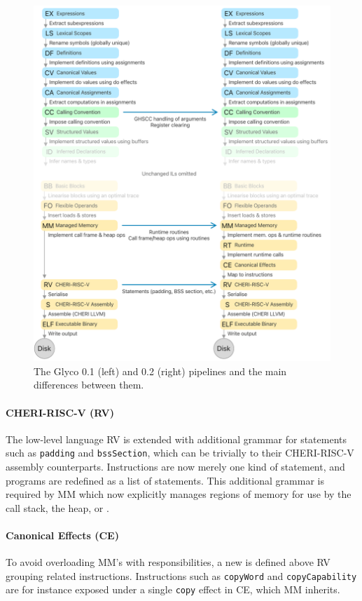 \documentclass[main.tex]{subfiles}
\begin{document}
\begin{figure}
	\centering
	\includegraphics{Images/Pipeline v0.2.pdf}
	\caption{The Glyco 0.1 (left) and 0.2 (right) pipelines and the main differences between them.}
	\label{fig:pipeline02}
\end{figure}

\paragraph{CHERI-RISC-V (RV)} The low-level language RV is extended with additional grammar for statements such as \texttt{padding} and \texttt{bssSection}, which can be  trivially to their CHERI-RISC-V assembly counterparts. Instructions are now merely one kind of statement, and programs are redefined as a list of statements. This additional grammar is required by MM which now explicitly manages regions of memory for use by the call stack, the heap, or .

\paragraph{Canonical Effects (CE)} To avoid overloading MM's  with responsibilities, a new  is defined above RV grouping related instructions. Instructions such as \texttt{copyWord} and \texttt{copyCapability} are for instance exposed under a single \texttt{copy} effect in CE, which MM inherits.
\end{document}
